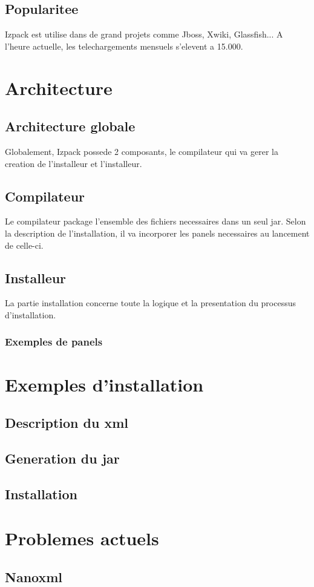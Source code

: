 \subsection{Popularitee}
Izpack est utilise dans de grand projets comme Jboss, Xwiki, Glassfish... A l'heure actuelle, les telechargements mensuels s'elevent a 15.000.
\section{Architecture}
\subsection{Architecture globale}
Globalement, Izpack possede 2 composants, le compilateur qui va gerer la creation de l'installeur et l'installeur.
\subsection{Compilateur}
Le compilateur package l'ensemble des fichiers necessaires dans un seul jar. Selon la description de l'installation, il va incorporer les panels necessaires au lancement de celle-ci. 
\subsection{Installeur}
La partie installation concerne toute la logique et la presentation du processus d'installation. 
\subsubsection{Exemples de panels}

\section{Exemples d'installation}
\subsection{Description du xml}
\subsection{Generation du jar}
\subsection{Installation}
\section{Problemes actuels}
\subsection{Nanoxml}